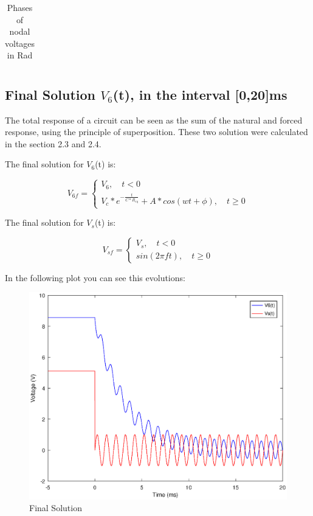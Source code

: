 \begin{table}[h]
\centering
\begin{tabularx}{0.6\textwidth} {
  | >{\raggedright\arraybackslash}X
  | >{\raggedleft\arraybackslash}X | }
 \hline

\end{tabularx}
\caption{Phases of nodal voltages in Rad}
\end{table}

\subsection{Final Solution $V_{6}$(t), in the interval [0,20]ms}


\par The total response of a circuit can be seen as the sum of the natural and forced response, using the principle of superposition. These two solution were calculated in the section 2.3 and 2.4.

The final solution for $V_6$(t) is: 

\begin{equation}
    V_{6f} = \begin{cases} V_6, \quad t<0 \\ V_{c}*e^{-\frac{t}{C*R_{eq}}} + A*cos(wt + \phi), \quad t \geq 0  \end{cases}
\end{equation}


The final solution for $V_s$(t) is:

\begin{equation}
    V_{sf} = \begin{cases} V_s, \quad t<0 \\ sin(2 \pi ft), \quad t \geq 0 \end{cases}
\end{equation}

In the following plot you can see this evolutions:

\begin{figure}[!h]\centering
\includegraphics[width=0.7\linewidth]{forced_and_natural_solution.eps}
\caption{Final Solution}
\label{fig:snat}
\end{figure}

